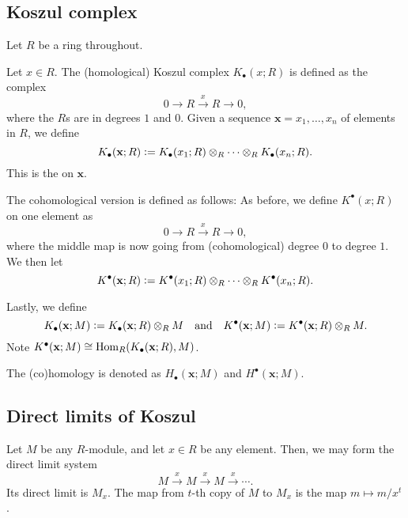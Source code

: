 \documentclass[12pt]{article}
\begin{document}
\subsection{Koszul complex}

Let $R$ be a ring throughout.

Let $x \in R$. The (homological) Koszul complex $K_{\bullet}(x; R)$ is defined as the complex 
\begin{equation*} 
	0 \to R \xrightarrow{x} R \to 0,
\end{equation*}
where the $R$s are in degrees $1$ and $0$. Given a sequence $\mathbf{x} = x_{1}, \ldots, x_{n}$ of elements in $R$, we define
\begin{equation*} 
	K_{\bullet}(\mathbf{x}; R) \vcentcolon= K_{\bullet}(x_{1}; R) \otimes_{R} \cdots \otimes_{R} K_{\bullet}(x_{n}; R).
\end{equation*}
This is the  on $\mathbf{x}$.

The cohomological version is defined as follows: As before, we define $K^{\bullet}(x; R)$ on one element as
\begin{equation*} 
	0 \to R \xrightarrow{x} R \to 0,
\end{equation*}
where the middle map is now going from (cohomological) degree $0$ to degree $1$. We then let
\begin{equation*} 
	K^{\bullet}(\mathbf{x}; R) \vcentcolon= K^{\bullet}(x_{1}; R) \otimes_{R} \cdots \otimes_{R} K^{\bullet}(x_{n}; R).
\end{equation*}

Lastly, we define
\begin{equation*} 
	K_{\bullet}(\mathbf{x}; M) \vcentcolon= K_{\bullet}(\mathbf{x}; R) \otimes_{R} M \quad\text{and}\quad K^{\bullet}(\mathbf{x}; M) \vcentcolon= K^{\bullet}(\mathbf{x}; R) \otimes_{R} M.
\end{equation*}
Note $K^{\bullet}(\mathbf{x}; M) \cong \operatorname{Hom}_{R}(K_{\bullet}(\mathbf{x}; R), M)$. 

The (co)homology is denoted as $H_{\bullet}(\mathbf{x}; M)$ and $H^{\bullet}(\mathbf{x}; M)$.

\subsection{Direct limits of Koszul}

Let $M$ be any $R$-module, and let $x \in R$ be any element. Then, we may form the direct limit system
\begin{equation*} 
	M \xrightarrow{x} M \xrightarrow{x} M \xrightarrow{x} \cdots.
\end{equation*}
Its direct limit is $M_{x}$. The map from $t$-th copy of $M$ to $M_{x}$ is the map $m \mapsto m/x^{t}$.
\end{document}
